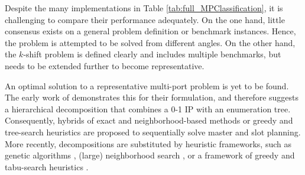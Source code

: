 \documentclass[preprint,12pt,authoryear]{elsarticle}
\begin{document}
Despite the many implementations in Table \ref{tab:full_MPClassification}, it is challenging to compare their performance adequately. On the one hand, little consensus exists on a general problem definition or benchmark instances. Hence, the problem is attempted to be solved from different angles. On the other hand, the $k$-shift problem is defined clearly and includes multiple benchmarks, but needs to be extended further to become representative.

An optimal solution to a representative multi-port problem is yet to be found. The early work of \cite{Botter1992StowageSolution} demonstrates this for their formulation, and therefore suggests a hierarchical decomposition that combines a 0-1 IP with an enumeration tree. Consequently, hybrids of exact and neighborhood-based methods \citep{Wilson2000ContainerSolutions, Kaisar2006ATRANSPORTATION, Pacino2011FastVessels} or greedy and tree-search heuristics \cite{Kang2002StowageTransportation} are proposed to sequentially solve master and slot planning. 
More recently, decompositions are substituted by heuristic frameworks, such as genetic algorithms \citep{Hamedi2011CONTAINERSHIPOPERATIONS, Hu2017Multi-objectiveRoute, Chang2022SolvingMode}, (large) neighborhood search  \citep{Pacino2018CranePlanning, Li2018Multi-PortUncertainties}, or a framework of greedy and tabu-search heuristics \citep{Liu2011RandomizedPlans}.
\end{document}
